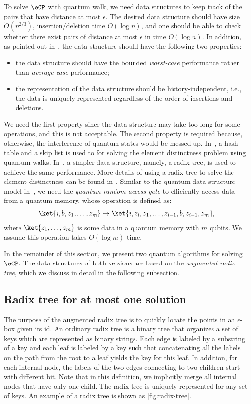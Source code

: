 To solve $\eCP$ with quantum walk, we need data structures to keep track of the pairs that have distance at most $\epsilon$. The desired data structure should have size $\tilde{O}(n^{2/3})$, insertion/deletion time $O(\log n)$, and one should be able to check whether there exist pairs of distance at most $\epsilon$ in time $O(\log n)$. In addition, as pointed out in~\cite{r5}, the data structure should have the following two properties:
\begin{itemize}
  \item the data structure should have the bounded \emph{worst-case} performance rather than \emph{average-case} performance;
  \item the representation of the data structure should be history-independent, i.e., the data is uniquely represented regardless of the order of insertions and deletions.
\end{itemize}

We need the first property since the data structure may take too long for some operations, and this is not acceptable. The second property is required because, otherwise, the interference of quantum states would be messed up. In~\cite{r5}, a hash table and a skip list is used to for solving the element distinctness problem using quantum walks. In~\cite{r11}, a simpler data structure, namely, a radix tree, is used to achieve the same performance. More details of using a radix tree to solve the element distinctness can be found in~\cite{r28}. Similar to the quantum data structure model in~\cite{r5,r11,r28}, we need the \emph{quantum random access gate} to efficiently access data from a quantum memory, whose operation is defined as:
\begin{align}
    \label{eq:qram-gate}
    \ket{i, b, z_1,\dots, z_m} \mapsto \ket{i, z_i, z_1, \ldots, z_{i-1}, b, z_{i+1}, z_m},
\end{align}
where $\ket{z_1,\dots, z_m}$ is some data in a quantum memory with $m$ qubits. We assume this operation takes $O(\log m)$ time.


In the remainder of this section, we present two quantum algorithms for solving $\eCP$. The data structures of both versions are based on the \textit{augmented radix tree}, which we discuss in detail in the following subsection.

\subsection{Radix tree for at most one solution}
\label{sec:radixtree}
The purpose of the augmented radix tree is to quickly locate the points in an $\epsilon$-box given its id. An ordinary radix tree is a binary tree that organizes a set of keys which are represented as binary strings. Each edge is labeled by a substring of a key and each leaf is labeled by a key such that concatenating all the labels on the path from the root to a leaf yields the key for this leaf. In addition, for each internal node, the labels of the two edges connecting to two children start with different bit. Note that in this definition, we implicitly merge all internal nodes that have only one child. The radix tree is uniquely represented for any set of keys. An example of a radix tree is shown as \cref{fig:radix-tree}.


